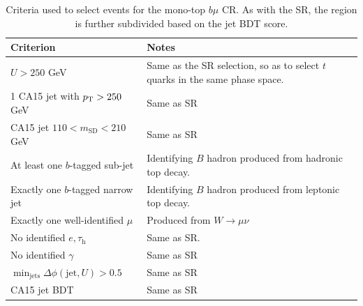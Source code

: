 \begin{table}[]
    \caption{Criteria used to select events for the mono-top $b\mu$ CR. As with the SR, the region is further subdivided based on the jet BDT score.}
    \label{tab:mt:tmn_cuts}
    \centering
    \begin{tabular}{p{}p{}}
        Criterion & Notes \\
        \hline
        \hline
        $U>250$ GeV & Same as the SR selection, so as to select $t$ quarks in the same phase space. \\
        1 CA15 jet with $p_\mathrm{T}>250$ GeV &  Same as SR \\
        CA15 jet $110 < m_\mathrm{SD} < 210$ GeV & Same as SR \\
        At least one $b$-tagged sub-jet & Identifying $B$ hadron produced from hadronic top decay. \\
        Exactly one $b$-tagged narrow jet & Identifying $B$ hadron produced from leptonic top decay. \\
        \hline
        Exactly one well-identified $\mu$ & Produced from $W\rightarrow\mu\nu$ \\
        No identified $e,\tau_\mathrm{h}$ & Same as SR. \\
        No identified $\gamma$ & Same as SR \\
        \hline
        $\min_\mathrm{jets}\Delta\phi(\mathrm{jet},U) > 0.5$ & Same as SR \\
        \hline
        CA15 jet BDT & Same as SR\\
    \end{tabular}
\end{table}

